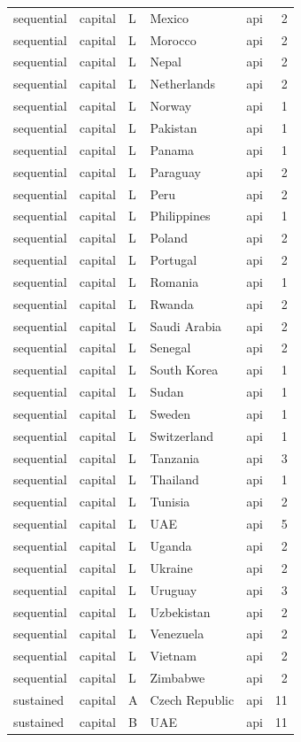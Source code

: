 \begin{tabular}{lllllr}
sequential & capital & L & Mexico & api & 2 \\
sequential & capital & L & Morocco & api & 2 \\
sequential & capital & L & Nepal & api & 2 \\
sequential & capital & L & Netherlands & api & 2 \\
sequential & capital & L & Norway & api & 1 \\
sequential & capital & L & Pakistan & api & 1 \\
sequential & capital & L & Panama & api & 1 \\
sequential & capital & L & Paraguay & api & 2 \\
sequential & capital & L & Peru & api & 2 \\
sequential & capital & L & Philippines & api & 1 \\
sequential & capital & L & Poland & api & 2 \\
sequential & capital & L & Portugal & api & 2 \\
sequential & capital & L & Romania & api & 1 \\
sequential & capital & L & Rwanda & api & 2 \\
sequential & capital & L & Saudi Arabia & api & 2 \\
sequential & capital & L & Senegal & api & 2 \\
sequential & capital & L & South Korea & api & 1 \\
sequential & capital & L & Sudan & api & 1 \\
sequential & capital & L & Sweden & api & 1 \\
sequential & capital & L & Switzerland & api & 1 \\
sequential & capital & L & Tanzania & api & 3 \\
sequential & capital & L & Thailand & api & 1 \\
sequential & capital & L & Tunisia & api & 2 \\
sequential & capital & L & UAE & api & 5 \\
sequential & capital & L & Uganda & api & 2 \\
sequential & capital & L & Ukraine & api & 2 \\
sequential & capital & L & Uruguay & api & 3 \\
sequential & capital & L & Uzbekistan & api & 2 \\
sequential & capital & L & Venezuela & api & 2 \\
sequential & capital & L & Vietnam & api & 2 \\
sequential & capital & L & Zimbabwe & api & 2 \\
sustained & capital & A & Czech Republic & api & 11 \\
sustained & capital & B & UAE & api & 11 \\
\bottomrule
\end{tabular}
